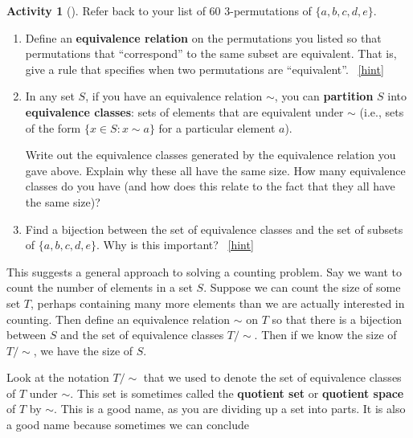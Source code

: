 \documentclass[10pt,]{book}
\newcommand{\terminology}[1]{\textbf{#1}}
\theoremstyle{plain}
\theoremstyle{definition}
\theoremstyle{definition}
\theoremstyle{definition}
\newtheorem{activity}[project]{Activity}
\numberwithin{equation}{chapter}
\def\st{:}
\begin{document}
\begin{activity}[]\label{activity-102}
\hypertarget{p-752}{}%
Refer back to your list of 60 3-permutations of \(\{a,b,c,d,e\}\).%
\begin{enumerate}[font=\bfseries,label=(\alph*),ref=\alph*]
\item\label{task-144} \hypertarget{p-753}{}%
Define an \terminology{equivalence relation} on the permutations you listed so that permutations that ``correspond'' to the same subset are equivalent.  That is, give a rule that specifies when two permutations are ``equivalent''.%
~\hfill{\tiny\hyperlink{a-109.a}{[hint]}\hypertarget{q-109.a}{}}\item\label{task-145} \hypertarget{p-755}{}%
In any set \(S\), if you have an equivalence relation \(\sim\), you can \terminology{partition} \(S\) into \terminology{equivalence classes}: sets of elements that are equivalent under \(\sim\) (i.e., sets of the form \(\{x \in S \st x \sim a\} \) for a particular element \(a\)).%
\par
\hypertarget{p-756}{}%
Write out the equivalence classes generated by the equivalence relation you gave above.  Explain why these all have the same size.  How many equivalence classes do you have (and how does this relate to the fact that they all have the same size)?%
\item\label{task-146} \hypertarget{p-757}{}%
Find a bijection between the set of equivalence classes and the set of subsets of \(\{a,b,c,d,e\}\).  Why is this important?%
~\hfill{\tiny\hyperlink{a-109.c}{[hint]}\hypertarget{q-109.c}{}}\end{enumerate}
\end{activity}
\hypertarget{p-759}{}%
This suggests a general approach to solving a counting problem.  Say we want to count the number of elements in a set \(S\).  Suppose we can count the size of some set \(T\), perhaps containing many more elements than we are actually interested in counting.  Then define an equivalence relation \(\sim\) on \(T\) so that there is a bijection between \(S\) and the set of equivalence classes \(T/\sim\).  Then if we know the size of \(T/\sim\), we have the size of \(S\).%
\par
\hypertarget{p-760}{}%
Look at the notation \(T/\sim\) that we used to denote the set of equivalence classes of \(T\) under \(\sim\).  This set is sometimes called the \terminology{quotient set} or \terminology{quotient space} of \(T\) by \(\sim\).  This is a good name, as you are dividing up a set into parts.  It is also a good name because sometimes we can conclude%
\end{document}
